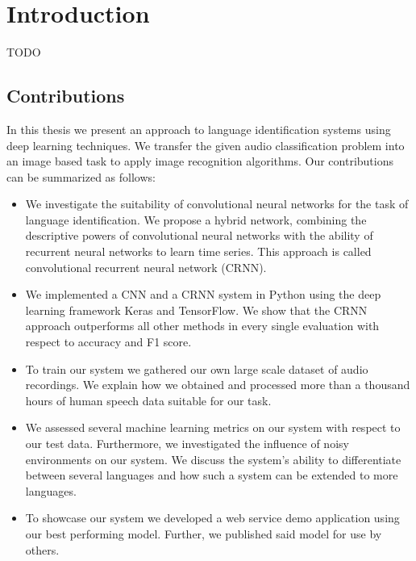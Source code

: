 \section{Introduction}

TODO


\subsection{Contributions}
In this thesis we present an approach to language identification systems using deep learning techniques. We transfer the given audio classification problem into an image based task to apply image recognition algorithms. Our contributions can be summarized as follows:
\begin{itemize}
	\item We investigate the suitability of convolutional neural networks for the task of language identification. We propose a hybrid network, combining the descriptive powers of convolutional neural networks with the ability of recurrent neural networks to learn time series. This approach is called convolutional recurrent neural network (CRNN). 
	\item We implemented a CNN and a CRNN system in Python using the deep learning framework Keras and TensorFlow. We show that the CRNN approach outperforms all other methods in every single evaluation with respect to accuracy and F1 score.
	\item To train our system we gathered our own large scale dataset of audio recordings. We explain how we obtained and processed more than a thousand hours of human speech data suitable for our task.
	\item We assessed several machine learning metrics on our system with respect to our test data. Furthermore, we investigated the influence of noisy environments on our system. We discuss the system's ability to differentiate between several languages and how such a system can be extended to more languages.
	\item To showcase our system we developed a web service demo application using our best performing model. Further, we published said model for use by others.
\end{itemize} 



